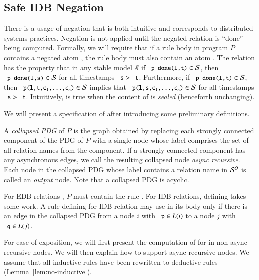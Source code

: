 \subsection{Safe IDB Negation}
\label{sec:perfect-construction}

There is a usage of negation that is both intuitive and corresponds to
distributed systems practices.  Negation is not applied until the negated
relation is ``done'' being computed.  Formally, we will require that if a rule
body in program $P$ contains a negated atom , the rule body must
also contain an atom . The relation  has the
property that in any stable model $\mathcal{S}$ if $\dedalus{p_done(l,t)} \in
\mathcal{S}$, then $\dedalus{p_done(l,s)} \in \mathcal{S}$ for all timestamps
$\dedalus{s} > \dedalus{t}$.  Furthermore, if $\dedalus{p_done(l,t)} \in
\mathcal{S}$, then $\dedalus{p(l,t,c\sub{1},\ldots,c\sub{n})} \in \mathcal{S}$
implies that $\dedalus{p(l,s,c\sub{1},\ldots,c\sub{n})} \in \mathcal{S}$ for all
timestamps $\dedalus{s} > \dedalus{t}$.  Intuitively,  is true
when the content of  is {\em sealed} (henceforth unchanging).

We will present a specification of  after introducing some preliminary definitions.

A {\em collapsed PDG} of $P$ is the graph obtained by replacing each strongly
connected component of the PDG of $P$ with a single node whose label comprises
the set of all relation names from the component.  If a strongly connected
component has any asynchronous edges, we call the resulting collapsed node {\em
  async recursive}.  Each node in the collapsed PDG whose label contains a
relation name in $\oschema$ is called an {\em output} node.  Note that a
collapsed PDG is acyclic.

For EDB relations , $P$ must contain the rule  .  For
IDB relations, defining  takes some work.  A rule defining
 for IDB relation  may use  in
its body only if there is an edge in the collapsed PDG from a node $i$ with
$\dedalus{p} \in L(i)$ to a node $j$ with $\dedalus{q} \in L(j)$.  

For ease of exposition, we will first present the computation of  for  in non-async-recursive nodes.  We will then explain how to support async recursive nodes.  We assume that all inductive rules have been rewritten to deductive rules (Lemma~\ref{lem:no-inductive}).

